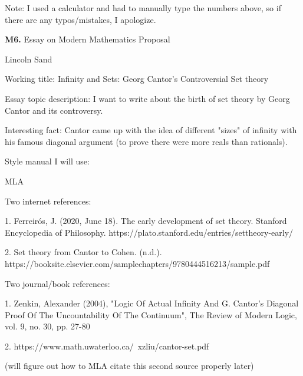 \documentclass{article}
\begin{document}
Note: I used a calculator and had to manually type the numbers above, so if there
are any typos/mistakes, I apologize.

\newpage

\textbf{M6.} Essay on Modern Mathematics Proposal

Lincoln Sand

Working title: Infinity and Sets: Georg Cantor's Controversial Set theory

Essay topic description: I want to write about the birth of set theory by Georg Cantor
and its controversy.

Interesting fact: Cantor came up with the idea of different "sizes"
of infinity with his famous diagonal argument
(to prove there were more reals than rationals).

Style manual I will use:

MLA

Two internet references:

1. Ferreirós, J. (2020, June 18). The early development of set theory. Stanford Encyclopedia of Philosophy. https://plato.stanford.edu/entries/settheory-early/ 

2. Set theory from Cantor to Cohen. (n.d.). https://booksite.elsevier.com/samplechapters/9780444516213/sample.pdf

Two journal/book references:

1. Zenkin, Alexander (2004), "Logic Of Actual Infinity And G. Cantor's Diagonal Proof Of The Uncountability Of The Continuum", The Review of Modern Logic, vol. 9, no. 30, pp. 27-80

2. https://www.math.uwaterloo.ca/~xzliu/cantor-set.pdf

(will figure out how to MLA citate this second source properly later)
\end{document}
